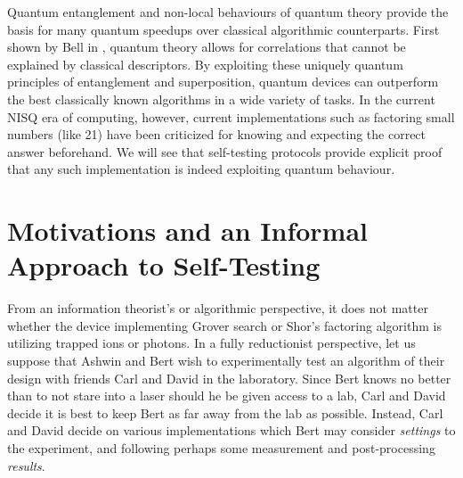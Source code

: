 \documentclass[runningheads,a4paper,english]{llncs}[2022/01/12]
\newcommand{\textcomment}[2]{\colorbox{yellow!60}{#1}\pdfcomment[color={0.234 0.867 0.211},hoffset=-6pt,voffset=10pt,opacity=0.5]{#2}}
\begin{document}

Quantum entanglement and non-local behaviours of quantum theory provide the basis for many quantum speedups over classical algorithmic counterparts.
First shown by Bell in \cite{bell64}, quantum theory allows for correlations that cannot be explained by classical descriptors.
By exploiting these uniquely quantum principles of entanglement and superposition, quantum devices can outperform the best classically known algorithms in a wide variety of tasks.
In the current NISQ era of computing, however, current implementations such as factoring small numbers (like 21) have been criticized for knowing and expecting the correct answer beforehand.
We will see that self-testing protocols provide explicit proof that any such implementation is indeed exploiting quantum behaviour.

\section{Motivations and an Informal Approach to Self-Testing}
\label{sec:motivations}

\newcount\LTGbeginlineexample
\newcount\LTGendlineexample
\newenvironment{ltgexample}%
{\LTGbeginlineexample=\numexpr\inputlineno+1\relax}%
{\LTGendlineexample=\numexpr\inputlineno-1\relax%
  \tcbinputlisting{%
    listing only,
    listing file=\currfilepath,
    colback=green!5!white,
    colframe=green!25,
    coltitle=black!90,
    coltext=black!90,
    left=8mm,
    title=Corresponding \LaTeX{} code of \texttt{\currfilepath},
    listing options={
        frame=none,
        language={[LaTeX]TeX},
        escapeinside={},
        firstline=\the\LTGbeginlineexample,
        lastline=\the\LTGendlineexample,
        firstnumber=\the\LTGbeginlineexample,
        basewidth=.5em,
        aboveskip=0mm,
        belowskip=0mm,
        numbers=left,
        xleftmargin=0mm,
        numberstyle=\tiny,
        numbersep=8pt%
      }
  }
}%

From an information theorist's or algorithmic perspective, it does not matter whether the device implementing Grover search or Shor's factoring algorithm is utilizing trapped ions or photons.
In a fully reductionist perspective, let us suppose that Ashwin and Bert wish to experimentally test an algorithm of their design with friends Carl and David in the laboratory.
Since Bert knows no better than to not stare into a laser should he be given access to a lab, Carl and David decide it is best to keep Bert as far away from the lab as possible.
Instead, Carl and David decide on various implementations which Bert may consider \textit{settings} to the experiment, and following perhaps some measurement and post-processing \textit{results}.
\end{document}
